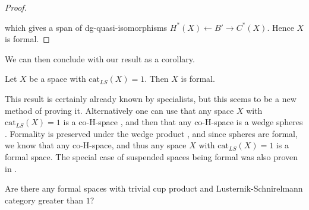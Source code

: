 \begin{proof}
\begin{center}
        \end{center}

    which gives a span of dg-quasi-isomorphisms 
    $H^\ast(X)\longleftarrow B'\longrightarrow C^\ast(X)$. Hence $X$ is formal. 
\end{proof}

We can then conclude with our result as a corollary.
\begin{corollary}
    Let $X$ be a space with $\text{cat}_{LS}(X)=1$. Then $X$ is formal.     
\end{corollary}

This result is certainly already known by specialists, but this seems to be a new method 
of proving it. Alternatively one can use that any space $X$ with $\text{cat}_{LS}(X)=1$ 
is a co-H-space \cite{hess}, and then that any co-H-space is a wedge spheres 
\cite{co-H-space}. Formality is preserved under the wedge product \cite{hess}, and since 
spheres are formal, we know that any co-H-space, and thus any space $X$ with 
$\text{cat}_{LS}(X)=1$ is a formal space. The special case of suspended spaces being 
formal was also proven in \cite{FHT}. 

\begin{question}
    Are there any formal spaces with trivial cup product and Lusternik-Schnirelmann 
    category greater than $1$?
\end{question}